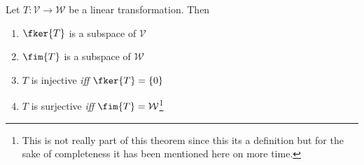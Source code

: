 \begin{thm}\label{thm-kernel-image-subspace}
	Let $T:\mathcal{V}\to\mathcal{W}$ be a linear transformation. Then
	\begin{enumerate}
		\item $\fker{T}$ is a subspace of $\mathcal{V}$
		\item $\fim{T}$ is a subspace of $\mathcal{W}$
		\item $T$ is injective \textit{iff} $\fker{T}=\{0\}$
		\item $T$ is surjective \textit{iff} $\fim{T}=\mathcal{W}$\footnote{This is
			      not really part of this theorem since this its a definition but for the sake
			      of completeness it has been mentioned here on more time.}
	\end{enumerate}
\end{thm}

